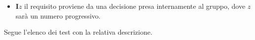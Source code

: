 \begin{itemize}
\begin{itemize}
        \item \textbf{I$z$} il requisito proviene da una decisione presa internamente al gruppo, dove $z$ sarà un numero progressivo.
    \end{itemize}
\end{itemize}

Segue l'elenco dei test con la relativa descrizione.

